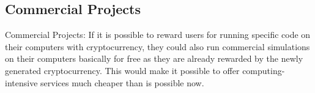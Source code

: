 \subsection{Commercial Projects}

Commercial Projects: If it is possible to reward users for running specific code on their computers with cryptocurrency, they could also run commercial simulations on their computers basically for free as they are already rewarded by the newly generated cryptocurrency. This would make it possible to offer computing-intensive services much cheaper than is possible now.
